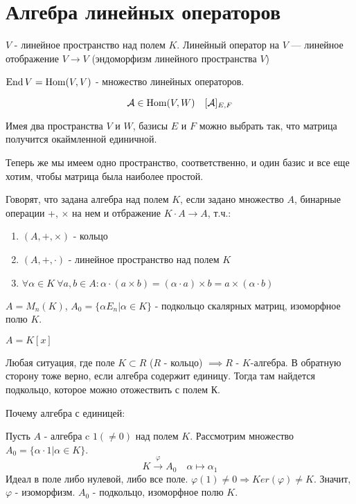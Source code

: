 \documentclass[main]{subfiles}
\begin{document}
\chapter{Алгебра линейных операторов}
\begin{definition} 
$V$ - линейное пространство над полем $K$. 
Линейный оператор на $V$ — линейное отображение $V \to V$ (эндоморфизм линейного пространства $V$)
\end{definition}
\begin{definition} 
$\operatorname{End} V = \operatorname{Hom}(V, V)$ - множество линейных операторов.
\end{definition}

\[\mathcal{A} \in \operatorname{Hom} (V, W) \quad [\mathcal{A}]_{E,F}\]

Имея два пространства $V$ и $W$, базисы $E$ и $F$ можно выбрать так, что матрица получится окаймленной единичной.

Теперь же мы имеем одно пространство, соответственно, и один базис и все еще хотим, чтобы матрица была наиболее простой. 

\begin{definition} 
    Говорят, что задана алгебра над полем $K$, если задано множество $A$, бинарные операции +, $\times$ на нем и отбражение $K \cdot A \to A$, т.ч.:
    \begin{enumerate}
        \item $(A,+, \times)$ - кольцо 
        \item $(A,+, \cdot)$ - линейное пространство над полем $K$
        \item $\forall \alpha \in K \  \forall a, b \in A : \alpha \cdot (a \times b) = (\alpha \cdot a) \times b = a \times (\alpha \cdot b)$
    \end{enumerate}
\end{definition}

\begin{example}
    $A = M_n(K)$, 
    $A_0 = \{ \alpha E_n | \alpha \in K\}$ - подкольцо скалярных матриц, изоморфное полю $K$.
\end{example}

\begin{example}
    $A = K[x]$
\end{example}   
\begin{example}
    Любая ситуация, где поле $K \subset R$ ($R$ - кольцо) $\implies R$ - $K$-алгебра. В обратную сторону тоже верно, если алгебра содержит единицу. Тогда там найдется подкольцо, которое можно отожествить с полем К.
    
    Почему алгебра с единицей: 

    Пусть $A$ - алгебра c $1(\neq0)$ над полем $K$.
    Рассмотрим множество $A_0 = \{\alpha \cdot 1| \alpha \in K\}$. 
    $$K \xrightarrow{\varphi} A_0 \quad \alpha \mapsto \alpha_1$$
    Идеал в поле либо нулевой, либо все поле. 
    $\varphi(1) \neq 0 \Rightarrow Ker(\varphi)\neq K$. 
    Значит,  $\varphi$ - изоморфизм. $A_0$ - подкольцо, изоморфное полю $K$.
\end{example}
\end{document}
